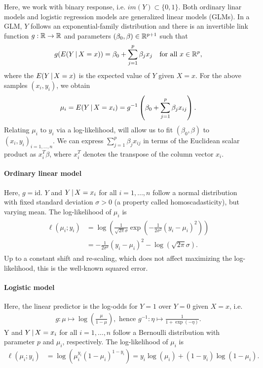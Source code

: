 Here, we work with binary response, i.e. $im(Y) \subset \{0, 1\}$. Both ordinary 
linar models and logistic regression models are generalized linear models (GLMs). In 
a GLM, $Y$ follows an exponential-family distribution and there is an invertible link function 
$g: \mathbb{R} \to \mathbb{R}$ and parameters $(\beta_0, \beta) \in \mathbb{R}^{p+1}$ such that
\begin{align}
    g(E(Y \,|\, X = x)) = \beta_0 + \sum_{j=1}^p \beta_j x_j \quad \text{for all } x \in \mathbb{R}^p,
\end{align}
where the $E(Y \,|\, X = x)$ is the expected value of $Y$ given $X = x$. For the above samples 
$(x_i, y_i)$, we obtain
\begin{align}
    \mu_i = E(Y \,|\, X = x_i) = g^{-1}\left(\beta_0 + \sum_{j=1}^p \beta_j x_{ij}\right).
\end{align}
Relating $\mu_i$ to $y_i$ via a log-likelihood, will allow us to fit $(\beta_0, \beta)$ to 
$(x_i, y_i)_{i = 1, \ldots, n}$. We can express $\sum_{j=1}^p \beta_j x_{ij}$ in terms of the 
Euclidean scalar product as $x_i^T \beta$, where $x_i^T$ denotes the transpose of the column vector 
$x_i$.

\paragraph{Ordinary linear model}
Here, $g = \text{id}$. $Y$ and $Y \,|\, X = x_i$ for all $i = 1, \ldots, n$ follow a normal
distribution with fixed standard deviation $\sigma > 0$ (a property called homoscadasticity), but 
varying mean. The log-likelihood of $\mu_i$ is
\begin{align}
\begin{split}
    \ell(\mu_i; y_i) &= \log\left( \frac{1}{\sqrt{2\pi}\sigma} 
        \exp \left( -\frac{1}{2\sigma^2}(y_i - \mu_i)^2 \right) \right) \\
    &= -\frac{1}{2\sigma^2}(y_i - \mu_i)^2 - \log \left( \sqrt{2\pi}\sigma \right).
\end{split}
\end{align}
Up to a constant shift and re-scaling, which does not affect maximizing the log-likelihood, this
is the well-known squared error.

\paragraph{Logistic model}
Here, the linear predictor is the log-odds for $Y = 1$ over $Y = 0$ given $X = x$, i.e.
\begin{align}
    g: \mu \mapsto \log\left( \frac{\mu}{1 - \mu} \right), \text{ hence } g^{-1}: \eta \mapsto
    \frac{1}{1 + \exp(-\eta)}.
\end{align}
Y and $Y \,|\, X = x_i$ for all $i = 1, \ldots, n$ follow a Bernoulli distribution with parameter 
$p$ and $\mu_i$, respectively. The log-likelihood of $\mu_i$ is
\begin{align}
    \ell(\mu_i; y_i) &= \log\left( \mu_i^{y_i} (1 - \mu_i)^{1 - y_i} \right) 
    = y_i \log(\mu_i) + (1 - y_i) \log(1 - \mu_i). 
\end{align}

